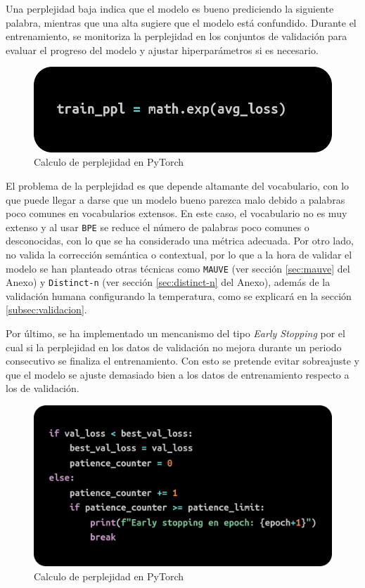 \documentclass[11pt]{book}
\begin{document}
Una perplejidad baja indica que el modelo es bueno prediciendo la siguiente palabra, mientras que una alta sugiere que el modelo está confundido. Durante el entrenamiento, se monitoriza la perplejidad en los conjuntos de validación para evaluar el progreso del modelo y ajustar hiperparámetros si es necesario.

\begin{figure}[h]
    \centering
    \includegraphics[width=0.5\linewidth]{img/perplexity.png}
    \caption{Calculo de perplejidad en PyTorch \parencite{stackoverflow_perplexity_pytorch}}
    \label{fig:placeholder21}
\end{figure}

El problema de la perplejidad \parencite{singh2024perplexitymatters} es que depende altamante del vocabulario, con lo que puede llegar a darse que un modelo bueno parezca malo debido a palabras poco comunes en vocabularios extensos. En este caso, el vocabulario no es muy extenso y al usar \texttt{BPE} se reduce el número de palabras poco comunes o desconocidas, con lo que se ha considerado una métrica adecuada. Por otro lado, no valida la corrección semántica o contextual, por lo que a la hora de validar el modelo se han planteado otras técnicas como \texttt{MAUVE} \parencite{krishnap25_mauve_github} (ver sección \ref{sec:mauve} del Anexo) y \texttt{Distinct-n} (ver sección \ref{sec:distinct-n} del Anexo), además de la validación humana configurando la temperatura, como se explicará en la sección \ref{subsec:validacion}.

Por último, se ha implementado un mencanismo del tipo \textit{Early Stopping} por el cual si la perplejidad en los datos de validación no mejora durante un periodo consecutivo se finaliza el entrenamiento. Con esto se pretende evitar sobreajuste y que el modelo se ajuste demasiado bien a los datos de entrenamiento respecto a los de validación.

\begin{figure}[h]
    \centering
    \includegraphics[width=0.5\linewidth]{img/early_stop.png}
    \caption{Calculo de perplejidad en PyTorch \parencite{stackoverflow_perplexity_pytorch}}
    \label{fig:placeholder23}
\end{figure}
\end{document}
